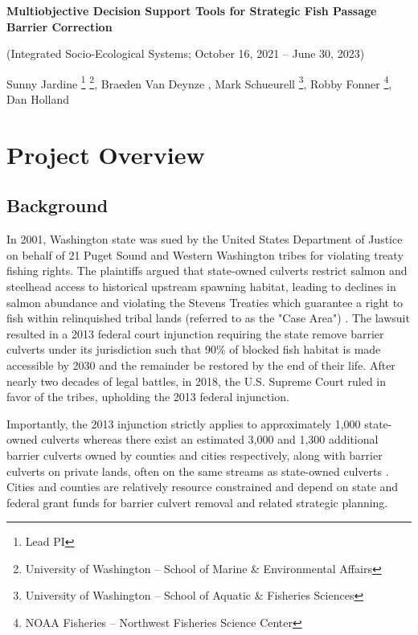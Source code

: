\documentclass[12pt]{elsarticle}
\begin{document}
	
\begin{center}
		\textbf{Multiobjective Decision Support Tools for Strategic Fish Passage Barrier Correction}
		
		(Integrated Socio-Ecological Systems; October 16, 2021 -- June 30, 2023)

		\vspace{0.1cm}
		Sunny Jardine \footnote{Lead PI} \footnote{University of Washington -- School of Marine \& Environmental Affairs}, Braeden Van Deynze \footnotemark[2], Mark Schueurell \footnote{University of Washington -- School of Aquatic \& Fisheries Sciences}, Robby Fonner \footnote{NOAA Fisheries -- Northwest Fisheries Science Center}, Dan Holland \footnotemark[4]
\end{center}

	
	\section{Project Overview}
	\subsection{Background} 
	In 2001, Washington state was sued by the United States Department of Justice on behalf of 21 Puget Sound and Western Washington tribes for violating treaty fishing rights. The plaintiffs argued that state-owned culverts restrict salmon and steelhead access to historical upstream spawning habitat, leading to declines in salmon abundance and violating the Stevens Treaties which guarantee a right to fish within relinquished tribal lands (referred to as the "Case Area") \citep{hickey_highway_2018}. The lawsuit resulted in a 2013 federal court injunction requiring the state remove barrier culverts under its jurisdiction such that 90\% of blocked fish habitat is made accessible by 2030 and the remainder be restored by the end of their life. After nearly two decades of legal battles, in 2018, the U.S. Supreme Court ruled in favor of the tribes, upholding the 2013 federal injunction. 
	
	Importantly, the 2013 injunction strictly applies to approximately 1,000 state-owned culverts whereas there exist an estimated 3,000 and 1,300 additional barrier culverts owned by counties and cities respectively, along with barrier culverts on private lands, often on the same streams as state-owned culverts \citep{brown_coming_2019}. Cities and counties are relatively resource constrained and depend on state and federal grant funds for barrier culvert removal and related strategic planning. 
	
\end{document}
